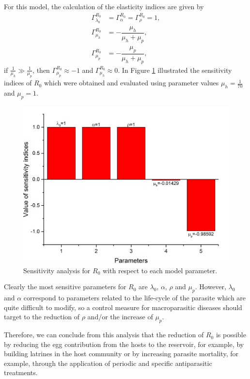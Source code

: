 \documentclass[eng]{MMSB-class-eng}
\begin{document}
{	For this model, the calculation of the elasticity indices are given by	
	\begin{equation}
	\begin{split}
	\Gamma^{R_0}_{\lambda_0}&=\Gamma^{R_0}_{\alpha}=\Gamma^{R_0}_{\rho}=1,\\ 
	\Gamma^{R_0}_{\mu_h}&=-\dfrac{\mu_h}{\mu_{h}+\mu_p},\\
	\Gamma^{R_0}_{\mu_p}&=-\dfrac{\mu_p}{\mu_{h}+\mu_p},
	\end{split}
	\end{equation}
	if $\frac{1}{\mu_h} \gg \frac{1}{\mu_p}$, then $\Gamma^{R_0}_{\mu_p}\approx -1$
	and 
	$\Gamma^{R_0}_{\mu_h}\approx 0$.
	In Figure \ref{fig:sensitivity} illustrated the sensitivity indices of $R_0$ which were obtained and evaluated using parameter values 
	$\mu_h=\frac{1}{70}$ and $\mu_p=1$.
	\begin{figure}[h!]
		\centering
		\includegraphics[width=0.9\linewidth]{sensitivity}
		\caption{Sensitivity analysis for $R_0$ with respect to each model parameter.}
		\label{fig:sensitivity}
	\end{figure}
	
	Clearly the most sensitive parameters for $R_0$ are $\lambda_0$, $\alpha$, $\rho$ and $\mu_p$.
	However, $\lambda_0$ and $\alpha$ correspond to parameters related to the life-cycle of the parasite which are quite difficult to modify, so a control measure for macroparasitic diseases should target to the reduction of $\rho$ and/or the increase of $\mu_p$.
	
	Therefore, we can conclude from this analysis that the reduction of $R_0$ 
	is possible by reducing the egg contribution from the hosts to the reservoir, for example, by building latrines in the host community or by increasing parasite mortality, for example, through the application of periodic and specific antiparasitic treatments.
	
	
	
	
}
\end{document}
